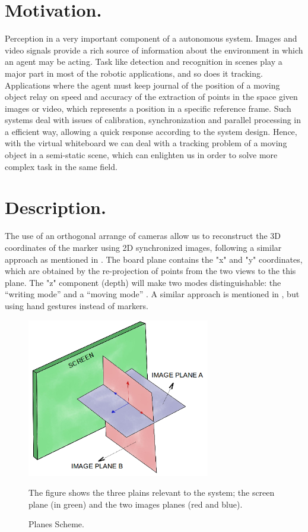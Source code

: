 \documentclass[a4paper,12pt]{article}
\begin{document}
\section{Motivation.}
Perception in a very important component of a autonomous system. Images and video signals provide a rich source of information about the environment in which an agent may be acting. Task like detection and recognition in scenes play a major part in most of the robotic applications, and so does it tracking. Applications where the agent must keep journal of the position of a moving object relay on speed and accuracy of the extraction of points in the space given images or video, which represents a position in a specific reference frame. Such systems deal with issues of calibration, synchronization and parallel processing in a efficient way, allowing a quick response according to the system design. Hence, with the virtual whiteboard we can deal with a tracking problem of a moving object in a semi-static scene, which can enlighten us in order to solve more complex task in the same field.
\section{Description.}
The use of an orthogonal arrange of cameras allow us to reconstruct the 3D coordinates of the marker using 2D synchronized images, following a similar approach as mentioned in \cite{laganiere}. The board plane contains the "x" and "y" coordinates, which are obtained by the re-projection of points from the two views to the this plane. The "z" component (depth) will make two modes distinguishable: the “writing mode” and a “moving mode” . A similar approach is mentioned in \cite{zabulis}, but using hand gestures instead of markers.

\begin{figure}[H]
    \begin{center}
    \includegraphics[width=8cm]{planesScheme.png}
    \caption{Planes Scheme.}
    The figure shows the three plains relevant to the system; the screen plane (in green) and  the two images planes (red and blue).
	\label{fig:planes}
    \end{center}
\end{figure}
\end{document}
